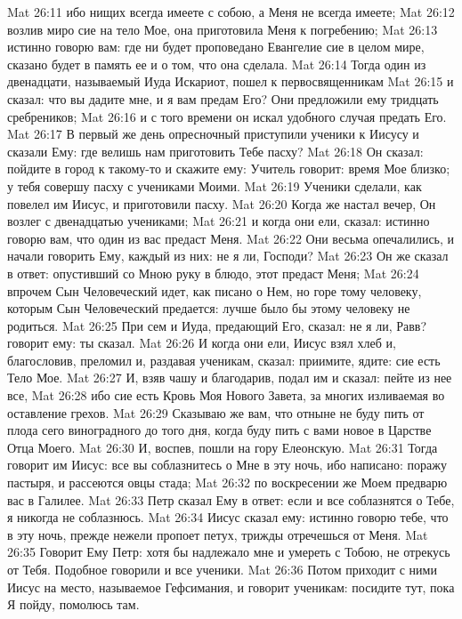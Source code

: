 \vs Mat 26:11 ибо нищих всегда имеете с собою, а Меня не всегда имеете;
\vs Mat 26:12 возлив миро сие на тело Мое, она приготовила Меня к погребению;
\vs Mat 26:13 истинно говорю вам: где ни будет проповедано Евангелие сие в целом мире, сказано будет в память ее и о том, что она сделала.
\vs Mat 26:14 Тогда один из двенадцати, называемый Иуда Искариот, пошел к первосвященникам
\vs Mat 26:15 и сказал: что вы дадите мне, и я вам предам Его? Они предложили ему тридцать сребреников;
\vs Mat 26:16 и с того времени он искал удобного случая предать Его.
\vs Mat 26:17 В первый же день опресночный приступили ученики к Иисусу и сказали Ему: где велишь нам приготовить Тебе пасху?
\vs Mat 26:18 Он сказал: пойдите в город к такому-то и скажите ему: Учитель говорит: время Мое близко; у тебя совершу пасху с учениками Моими.
\vs Mat 26:19 Ученики сделали, как повелел им Иисус, и приготовили пасху.
\rsbpar\vs Mat 26:20 Когда же настал вечер, Он возлег с двенадцатью учениками;
\vs Mat 26:21 и когда они ели, сказал: истинно говорю вам, что один из вас предаст Меня.
\vs Mat 26:22 Они весьма опечалились, и начали говорить Ему, каждый из них: не я ли, Господи?
\vs Mat 26:23 Он же сказал в ответ: опустивший со Мною руку в блюдо, этот предаст Меня;
\vs Mat 26:24 впрочем Сын Человеческий идет, как писано о Нем, но горе тому человеку, которым Сын Человеческий предается: лучше было бы этому человеку не родиться.
\vs Mat 26:25 При сем и Иуда, предающий Его, сказал: не я ли, Равв?  говорит ему: ты сказал.
\rsbpar\vs Mat 26:26 И когда они ели, Иисус взял хлеб и, благословив, преломил и, раздавая ученикам, сказал: приимите, ядите: сие есть Тело Мое.
\vs Mat 26:27 И, взяв чашу и благодарив, подал им и сказал: пейте из нее все,
\vs Mat 26:28 ибо сие есть Кровь Моя Нового Завета, за многих изливаемая во оставление грехов.
\vs Mat 26:29 Сказываю же вам, что отныне не буду пить от плода сего виноградного до того дня, когда буду пить с вами новое  в Царстве Отца Моего.
\rsbpar\vs Mat 26:30 И, воспев, пошли на гору Елеонскую.
\vs Mat 26:31 Тогда говорит им Иисус: все вы соблазнитесь о Мне в эту ночь, ибо написано: поражу пастыря, и рассеются овцы стада;
\vs Mat 26:32 по воскресении же Моем предварю вас в Галилее.
\vs Mat 26:33 Петр сказал Ему в ответ: если и все соблазнятся о Тебе, я никогда не соблазнюсь.
\vs Mat 26:34 Иисус сказал ему: истинно говорю тебе, что в эту ночь, прежде нежели пропоет петух, трижды отречешься от Меня.
\vs Mat 26:35 Говорит Ему Петр: хотя бы надлежало мне и умереть с Тобою, не отрекусь от Тебя. Подобное говорили и все ученики.
\rsbpar\vs Mat 26:36 Потом приходит с ними Иисус на место, называемое Гефсимания, и говорит ученикам: посидите тут, пока Я пойду, помолюсь там.
